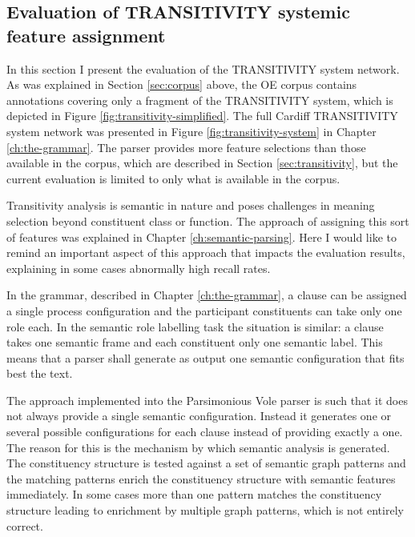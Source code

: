     
    
\subsection{Evaluation of TRANSITIVITY systemic feature assignment}
\label{sec:systemic-evaluation-TRANSITIVITY}
    
    In this section I present the evaluation of the TRANSITIVITY system network. As was explained in Section \ref{sec:corpus} above, the OE corpus contains annotations covering only a fragment of the TRANSITIVITY system, which is depicted in Figure \ref{fig:transitivity-simplified}. The full Cardiff TRANSITIVITY system network was presented in Figure \ref{fig:transitivity-system} in Chapter \ref{ch:the-grammar}. The parser provides more feature selections than those available in the corpus, which are described in Section \ref{sec:transitivity}, but the current evaluation is limited to only what is available in the corpus.
    
    Transitivity analysis is semantic in nature and poses challenges in meaning selection beyond constituent class or function. The approach of assigning this sort of features was explained in Chapter \ref{ch:semantic-parsing}. Here I would like to remind an important aspect of this approach that impacts the evaluation results, explaining in some cases abnormally high recall rates.
    
    In the grammar, described in Chapter \ref{ch:the-grammar}, a clause can be assigned a single process configuration and the participant constituents can take only one role each. In the semantic role labelling task the situation is similar: a clause takes one semantic frame and each constituent only one semantic label. This means that a parser shall generate as output one semantic configuration that fits best the text. 
    
    The approach implemented into the Parsimonious Vole parser is such that it does not always provide a single semantic configuration. Instead it generates one or several possible configurations for each clause instead of providing exactly a one. The reason for this is the mechanism by which semantic analysis is generated. The constituency structure is tested against a set of semantic graph patterns and the matching patterns enrich the constituency structure with semantic features immediately. In some cases more than one pattern matches the constituency structure leading to enrichment by multiple graph patterns, which is not entirely correct. 
    
